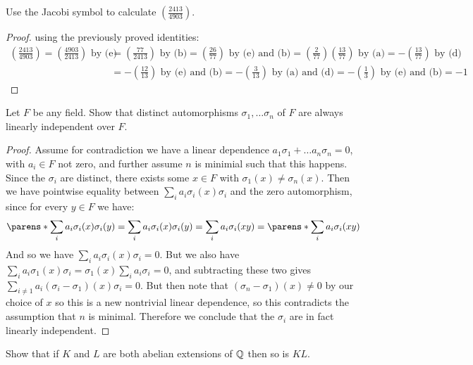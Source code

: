 \documentclass[11pt]{article}
\newcommand{\legendre}[2]{\genfrac{(}{)}{}{}{#1}{#2}}
\begin{document}
Use the Jacobi symbol to calculate $\legendre{2413}{4903}$.
\begin{proof}
  using the previously proved identities:
  \begin{align*}
    \legendre{2413}{4903}
    = \legendre{4903}{2413} \text{ by (e)} 
    &= \legendre{77}{2413} \text{ by (b)} 
    = \legendre{26}{77} \text{ by (e) and (b)}
    = \legendre{2}{77} \legendre{13}{77} \text{ by (a)} 
    = - \legendre{13}{77} \text{ by (d)} \\
    &= - \legendre{12}{13} \text{ by (e) and (b)} 
    = - \legendre{3}{13} \text{ by (a) and (d)} 
    = - \legendre{1}{3} \text{ by (e) and (b)} 
    = -1
  \end{align*}
\end{proof}


Let $F$ be any field. Show that distinct automorphisms $\sigma_1, \dots \sigma_n$ of $F$ are always linearly independent over $F$.

\begin{proof}
  Assume for contradiction we have a linear dependence $a_1\sigma_1 + \dots a_n\sigma_n = 0$, with $a_i \in F$ not zero, and further assume $n$ is minimial such that this happens.
  Since the $\sigma_i$ are distinct, there exists some $x \in F$ with $\sigma_1(x) \ne \sigma_n(x)$.
  Then we have pointwise equality between $\sum_i a_i \sigma_i(x) \sigma_i$ and the zero automorphism, since for every $y \in F$ we have:
  \begin{equation*}
    \parens*{\sum_i a_i \sigma_i(x) \sigma_i}(y)
    = \sum_i a_i \sigma_i(x) \sigma_i(y)
    = \sum_i a_i \sigma_i(xy)
    = \parens*{\sum_i a_i \sigma_i}(xy)
  \end{equation*}
  And so we have $\sum_i a_i \sigma_i(x) \sigma_i = 0$.
  But we also have $\sum_i a_i \sigma_1(x) \sigma_i = \sigma_1(x) \sum_i a_i \sigma_i = 0$, and subtracting these two gives $\sum_{i \ne 1} a_i (\sigma_i - \sigma_1)(x) \sigma_i = 0$.
  But then note that $(\sigma_n - \sigma_1)(x) \ne 0$ by our choice of $x$ so this is a new nontrivial linear dependence, so this contradicts the assumption that $n$ is minimal.
  Therefore we conclude that the $\sigma_i$ are in fact linearly independent.
\end{proof}


Show that if $K$ and $L$ are both abelian extensions of $\mathbb{Q}$ then so is $KL$.
\end{document}
